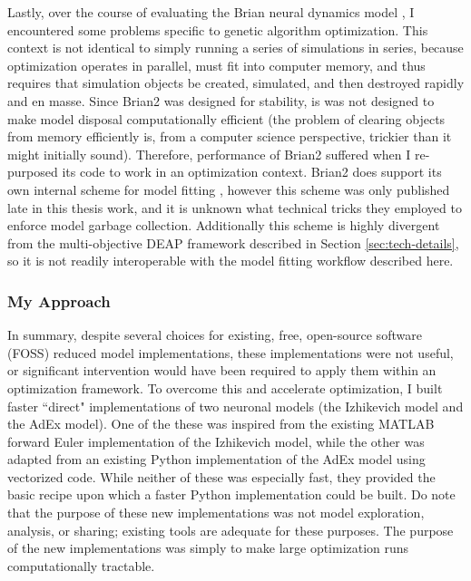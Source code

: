 Lastly, over the course of evaluating the Brian neural dynamics model \citep{gerstner2014neuronal}, I encountered some problems specific to genetic algorithm optimization.
This context is not identical to simply running a series of simulations in series, because optimization operates in parallel, must fit into computer memory, and thus requires that simulation objects be created, simulated, and then destroyed rapidly and en masse.
Since Brian2 was designed for stability, is was not designed to make model disposal computationally efficient (the problem of clearing objects from memory efficiently is, from a computer science perspective, trickier than it might initially sound).
Therefore, performance of Brian2 suffered when I re-purposed its code to work in an optimization context.
Brian2 does support its own internal scheme for model fitting \citep{brian2modelfitting}, however this scheme was only published late in this thesis work, and it is unknown what technical tricks they employed to enforce model garbage collection. 
Additionally this scheme is highly divergent from the multi-objective DEAP framework described in Section \ref{sec:tech-details}, so it is not readily interoperable with the model fitting workflow described here.

\subsubsection{My Approach}
\label{sec:new-models}
In summary, despite several choices for existing, free, open-source software (FOSS) reduced model
implementations, these implementations were not useful, or significant intervention would have been required to apply them within an optimization framework.
To overcome this and accelerate optimization, I built faster ``direct" implementations of two neuronal models (the Izhikevich model and the AdEx model).
One of the these was inspired from the existing MATLAB forward Euler implementation of the Izhikevich model, while the other was adapted from an existing Python implementation of the AdEx model using vectorized code.
While neither of these was especially fast, they provided the basic recipe upon which a faster Python implementation could be built.
Do note that the purpose of these new implementations was not model exploration, analysis, or sharing; existing tools are adequate for these purposes.
The purpose of the new implementations was simply to make large optimization runs computationally tractable.

